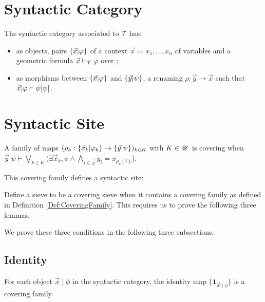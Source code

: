 \section{Syntactic Category}
\begin{definition}
  \leanok
  The syntactic category associated to $\mathcal{T}$ has:
  \begin{itemize}
    \item as objects, pairs $\{ \vec{x} | \varphi \}$ of a context $\vec{x} \coloneq x_1, \ldots, x_{n}$ of variables and a geometric formula $\vec{x} \vdash_{\mathcal{T}} \varphi$ over \thT{};
    \item as morphisms between $\{ \vec{x} | \varphi \}$ and $\{ \vec{y} | \psi \}$, a renaming $\rho : \vec{y} \to \vec{x}$ such that $\vec{x} | \varphi \vdash {\psi}[{\psi}]$.
  \end{itemize}
\end{definition}



\section{Syntactic Site}
\begin{definition}
  \label{Def:CoveringFamily}
  \leanok
  A family of maps $(\rho_k : \{ \vec{x}_k | \varphi_k \}\to \{ \vec{y} | \psi \})_{k \in K}$ with $K \in \mathscr{U}$ is covering when
  $\vec{y} | \psi \vdash \bigvee_{k \in K} (\exists \vec{x}_k, \phi \wedge \bigwedge_{i \in \vec{y}} y_i = x_{\rho_k(i)}$).
\end{definition}

This covering family defines a syntactic site:

\begin{definition}
  Define a sieve to be a covering sieve when it contains a covering family as defined in Definition \ref{Def:CoveringFamily}. This requires us to prove the following three lemmas.
\end{definition}

We prove these three conditions in the following three subsections.
\subsection{Identity}
\begin{lemma}
  For each object $\vec{x}\mid \phi$ in the syntactic category, the identity map $\{\mathbf{1}_{\vec{x}\mid\phi}\}$ is a covering family.
\end{lemma}

